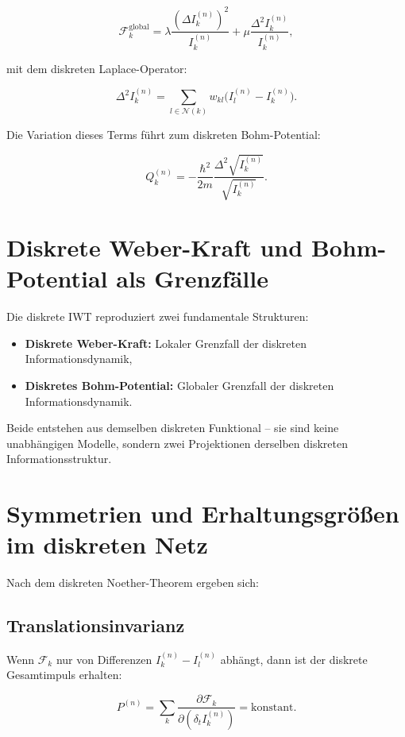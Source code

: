 \[
\mathcal{F}_k^{\text{global}} = \lambda \frac{(\Delta I_k^{(n)})^2}{I_k^{(n)}} + \mu \frac{\Delta^2 I_k^{(n)}}{I_k^{(n)}},
\]

mit dem diskreten Laplace-Operator:

\[
\Delta^2 I_k^{(n)} = \sum_{l \in \mathcal{N}(k)} w_{kl} \bigl( I_l^{(n)} - I_k^{(n)} \bigr).
\]

Die Variation dieses Terms führt zum diskreten Bohm-Potential:

\[
Q_k^{(n)} = -\frac{\hbar^2}{2m} \frac{\Delta^2 \sqrt{I_k^{(n)}}}{\sqrt{I_k^{(n)}}}.
\]

\section{Diskrete Weber-Kraft und Bohm-Potential als Grenzfälle}
\label{sec:grenzfaelle_weber_bohm}

Die diskrete IWT reproduziert zwei fundamentale Strukturen:

\begin{itemize}
    \item \textbf{Diskrete Weber-Kraft:} Lokaler Grenzfall der diskreten Informationsdynamik,
    \item \textbf{Diskretes Bohm-Potential:} Globaler Grenzfall der diskreten Informationsdynamik.
\end{itemize}

Beide entstehen aus demselben diskreten Funktional – sie sind keine unabhängigen Modelle, sondern zwei Projektionen derselben diskreten Informationsstruktur.

\section{Symmetrien und Erhaltungsgrößen im diskreten Netz}
\label{sec:symmetrien_erhaltung}

Nach dem diskreten Noether-Theorem ergeben sich:

\subsection{Translationsinvarianz}
\label{sub:translationsinvarianz}

Wenn \( \mathcal{F}_k \) nur von Differenzen \( I_k^{(n)} - I_l^{(n)} \) abhängt, dann ist der diskrete Gesamtimpuls erhalten:

\[
P^{(n)} = \sum_k \frac{\partial \mathcal{F}_k}{\partial (\delta_t I_k^{(n)})} = \text{konstant}.
\]

